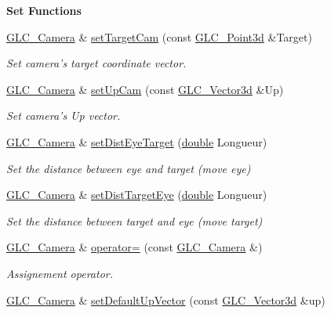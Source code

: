 \begin{Indent}{\bf Set Functions}
\begin{DoxyCompactItemize}
\hyperlink{class_g_l_c___camera}{G\-L\-C\-\_\-\-Camera} \& \hyperlink{class_g_l_c___camera_a29b69303e8e73800f8fbbac75ab71816}{set\-Target\-Cam} (const \hyperlink{glc__vector3d_8h_a4e13a9bbc7ab3d34de7e98b41836772c}{G\-L\-C\-\_\-\-Point3d} \&Target)
\begin{DoxyCompactList}\small\item\em Set camera's target coordinate vector. \end{DoxyCompactList}\item 
\hyperlink{class_g_l_c___camera}{G\-L\-C\-\_\-\-Camera} \& \hyperlink{class_g_l_c___camera_a5540fd0c002a2137a2ff0442cd3c9f11}{set\-Up\-Cam} (const \hyperlink{class_g_l_c___vector3d}{G\-L\-C\-\_\-\-Vector3d} \&Up)
\begin{DoxyCompactList}\small\item\em Set camera's Up vector. \end{DoxyCompactList}\item 
\hyperlink{class_g_l_c___camera}{G\-L\-C\-\_\-\-Camera} \& \hyperlink{class_g_l_c___camera_a07627bff5a1d0b0ca766098e10154cdf}{set\-Dist\-Eye\-Target} (\hyperlink{_super_l_u_support_8h_a8956b2b9f49bf918deed98379d159ca7}{double} Longueur)
\begin{DoxyCompactList}\small\item\em Set the distance between eye and target (move eye) \end{DoxyCompactList}\item 
\hyperlink{class_g_l_c___camera}{G\-L\-C\-\_\-\-Camera} \& \hyperlink{class_g_l_c___camera_a7a32e067b9c661c513792914906531b1}{set\-Dist\-Target\-Eye} (\hyperlink{_super_l_u_support_8h_a8956b2b9f49bf918deed98379d159ca7}{double} Longueur)
\begin{DoxyCompactList}\small\item\em Set the distance between target and eye (move target) \end{DoxyCompactList}\item 
\hyperlink{class_g_l_c___camera}{G\-L\-C\-\_\-\-Camera} \& \hyperlink{class_g_l_c___camera_acfab21ce3d4f23a00b3b07e62e44c7d4}{operator=} (const \hyperlink{class_g_l_c___camera}{G\-L\-C\-\_\-\-Camera} \&)
\begin{DoxyCompactList}\small\item\em Assignement operator. \end{DoxyCompactList}\item 
\hyperlink{class_g_l_c___camera}{G\-L\-C\-\_\-\-Camera} \& \hyperlink{class_g_l_c___camera_a5a2cfbbb9a41751d13e1af62b257db63}{set\-Default\-Up\-Vector} (const \hyperlink{class_g_l_c___vector3d}{G\-L\-C\-\_\-\-Vector3d} \&up)

\end{DoxyCompactItemize}
\end{Indent}
